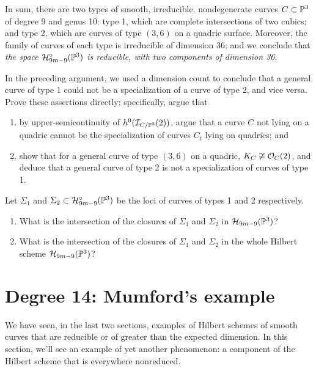 In sum, there are two types of smooth, irreducible, nondegenerate curves $C \subset \PP^3$ of degree 9 and genus 10: type 1, which are complete intersections of two cubics; and type 2, which are curves of type $(3,6)$ on a quadric surface. Moreover, the family of curves of each type is irreducible of dimension 36; and we conclude that \emph{the space $\cH^\circ_{9m-9}(\PP^3)$ is reducible, with two components of dimension 36}.


\begin{exercise}
In the preceding argument, we used a dimension count to conclude that a general curve of type 1 could not be a specialization of a curve of type 2, and vice versa. Prove these assertions directly: specifically, argue that
\begin{enumerate}
\item by upper-semicontinuity of $h^0(\cI_{C/\PP^3}(2))$, argue that a curve $C$ not lying on a quadric cannot be the specialization of curves $C_t$ lying on quadrics; and
\item show that for a general curve of type $(3,6)$ on a quadric, $K_C \not\cong \cO_C(2)$, and deduce that a general curve of type 2 is not a specialization of curves of type 1.
\end{enumerate}
\end{exercise}

\begin{exercise}
Let $\Sigma_1$ and $\Sigma_2 \subset \cH^\circ_{9m-9}(\PP^3)$ be the loci of curves of types 1 and 2 respectively. 
\begin{enumerate}
\item What is the intersection of the closures of $\Sigma_1$ and $\Sigma_2$ in $\cH_{9m-9}(\PP^3)$?
\item What is the intersection of the closures of $\Sigma_1$ and $\Sigma_2$ in the whole Hilbert scheme $\cH_{9m-9}(\PP^3)$?
\end{enumerate}
\end{exercise}

 

\section{Degree 14: Mumford's example}

We have seen, in the last two sections, examples of Hilbert schemes of smooth curves that are reducible or of greater than the expected dimension. In this section, we'll see an example of yet another phenomenon: a component of the Hilbert scheme that is everywhere nonreduced. 

